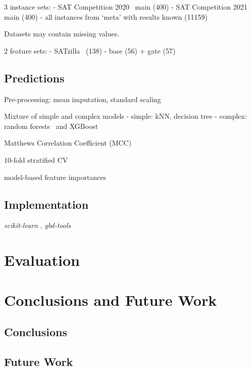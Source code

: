 \documentclass{article}
\begin{document}
3 instance sets:
- SAT Competition 2020~\cite{balyo2020proceedings} main (400)
- SAT Competition 2021~\cite{balyo2021proceedings} main (400)
- all instances from `meta' with results known (11159)

Datasets may contain missing values.

2 feature sets:
- SATzilla~\cite{xu2012features} (138)
- base (56) + gate (57)

\subsection{Predictions}

Pre-processing: mean imputation, standard scaling

Mixture of simple and complex models
- simple: kNN, decision tree
- complex: random forests~\cite{breiman2001random} and XGBoost~\cite{chen2016xgboost}

Matthews Correlation Coefficient (MCC)~\cite{matthews1975comparison, gorodkin2004comparing}

10-fold stratified CV

model-based feature importances

\subsection{Implementation}

\emph{scikit-learn} \cite{pedregosa2011scikit}, \emph{gbd-tools}~\cite{iser2020collaborative}

\section{Evaluation}
\label{sec:evaluation}

\section{Conclusions and Future Work}
\label{sec:conclusion}

\subsection{Conclusions}

\subsection{Future Work}

\printbibliography
\end{document}
